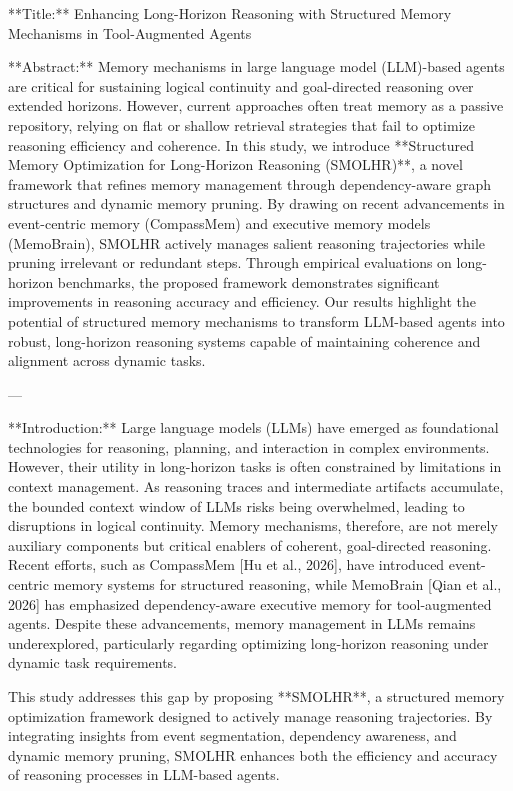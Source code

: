 **Title:**  
Enhancing Long-Horizon Reasoning with Structured Memory Mechanisms in Tool-Augmented Agents

**Abstract:**  
Memory mechanisms in large language model (LLM)-based agents are critical for sustaining logical continuity and goal-directed reasoning over extended horizons. However, current approaches often treat memory as a passive repository, relying on flat or shallow retrieval strategies that fail to optimize reasoning efficiency and coherence. In this study, we introduce **Structured Memory Optimization for Long-Horizon Reasoning (SMOLHR)**, a novel framework that refines memory management through dependency-aware graph structures and dynamic memory pruning. By drawing on recent advancements in event-centric memory (CompassMem) and executive memory models (MemoBrain), SMOLHR actively manages salient reasoning trajectories while pruning irrelevant or redundant steps. Through empirical evaluations on long-horizon benchmarks, the proposed framework demonstrates significant improvements in reasoning accuracy and efficiency. Our results highlight the potential of structured memory mechanisms to transform LLM-based agents into robust, long-horizon reasoning systems capable of maintaining coherence and alignment across dynamic tasks.  

---

**Introduction:**  
Large language models (LLMs) have emerged as foundational technologies for reasoning, planning, and interaction in complex environments. However, their utility in long-horizon tasks is often constrained by limitations in context management. As reasoning traces and intermediate artifacts accumulate, the bounded context window of LLMs risks being overwhelmed, leading to disruptions in logical continuity. Memory mechanisms, therefore, are not merely auxiliary components but critical enablers of coherent, goal-directed reasoning. Recent efforts, such as CompassMem [Hu et al., 2026], have introduced event-centric memory systems for structured reasoning, while MemoBrain [Qian et al., 2026] has emphasized dependency-aware executive memory for tool-augmented agents. Despite these advancements, memory management in LLMs remains underexplored, particularly regarding optimizing long-horizon reasoning under dynamic task requirements.  

This study addresses this gap by proposing **SMOLHR**, a structured memory optimization framework designed to actively manage reasoning trajectories. By integrating insights from event segmentation, dependency awareness, and dynamic memory pruning, SMOLHR enhances both the efficiency and accuracy of reasoning processes in LLM-based agents.  

